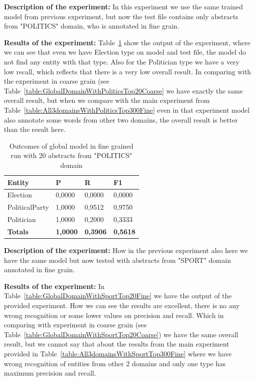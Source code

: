 \documentclass[thesis=M,english]{FITthesis}[2018/05/30]
\begin{document}
\textbf{Description of the experiment:} In this experiment we use the same trained model from previous experiment, but now the test file contains only abstracts from "POLITICS" domain, who is annotated in fine grain.

\textbf{Results of the experiment:} Table~\ref{table:GlobalDomainWithPoliticsTop20Fine} show the output of the experiment, where we can see that even we have Election type on model and test file, the model do not find any entity with that type. Also for the Politician type we have a very low recall, which reflects that there is a very low overall result. In comparing with the experiment in coarse grain (see Table~\ref{table:GlobalDomainWithPoliticsTop20Coarse} we have exactly the same overall result, but when we compare with the main experiment from Table~\ref{table:All3domainsWithPoliticsTop300Fine} even in that experiment model also annotate some words from other two domains, the overall result is better than the result here.

	\begin{table}[H]\centering
		\begin{tabular}{|l|l|l|l|}
			\hline {\textbf{Entity}} & {\textbf{P}} & {\textbf{R}} & {\textbf{F1}}\\\hline
				Election & 0,0000 & 0,0000 & 0,0000\\
				PoliticalParty & 1,0000 & 0,9512 & 0,9750\\
				Politician & 1,0000 & 0,2000 & 0,3333\\\hline
				\textbf{Totals} & \textbf{1,0000} & \textbf{0,3906} & \textbf{0,5618}\\\hline
		\end{tabular}
		\caption{Outcomes of global model in fine grained run with 20 abstracts from "POLITICS" domain \label{table:GlobalDomainWithPoliticsTop20Fine}}
	\end{table}	

\textbf{Description of the experiment:} How in the previous experiment also here we have the same model but now tested with abstracts from "SPORT" domain annotated in fine grain.

\textbf{Results of the experiment:} In Table~\ref{table:GlobalDomainWithSportTop20Fine} we have the output of the provided experiment. How we can see the results are excellent, there is no any wrong recognition or some lower values on precision and recall. Which in comparing with experiment in coarse grain (see Table~\ref{table:GlobalDomainWithSportTop20Coarse}) we have the same overall result, but we cannot say that about the results from the main experiment provided in Table~\ref{table:All3domainsWithSportTop300Fine} where we have wrong recognition of entities from other 2 domains and only one type has maximum precision and recall.
\end{document}
